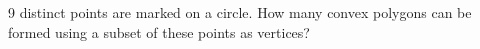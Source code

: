9 distinct points are marked on a circle. How many convex polygons can be formed using a subset of these points as vertices?
